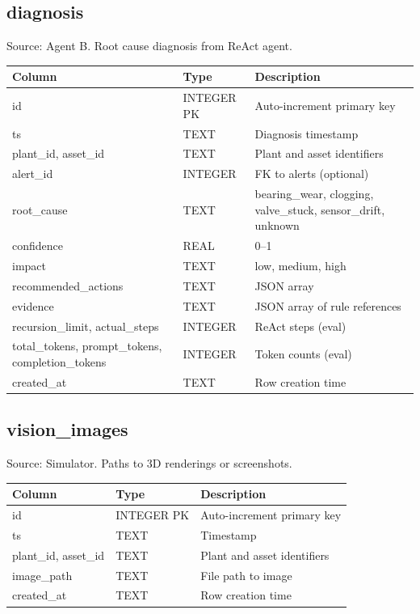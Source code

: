 \documentclass[12pt,letterpaper]{report}
\begin{document}
\subsection*{diagnosis}
Source: Agent B. Root cause diagnosis from ReAct agent.

\begin{tabular}{@{}llp{5.5cm}@{}}
\toprule
\textbf{Column} & \textbf{Type} & \textbf{Description} \\
\midrule
id & INTEGER PK & Auto-increment primary key \\
ts & TEXT & Diagnosis timestamp \\
plant\_id, asset\_id & TEXT & Plant and asset identifiers \\
alert\_id & INTEGER & FK to alerts (optional) \\
root\_cause & TEXT & bearing\_wear, clogging, valve\_stuck, sensor\_drift, unknown \\
confidence & REAL & 0--1 \\
impact & TEXT & low, medium, high \\
recommended\_actions & TEXT & JSON array \\
evidence & TEXT & JSON array of rule references \\
recursion\_limit, actual\_steps & INTEGER & ReAct steps (eval) \\
total\_tokens, prompt\_tokens, completion\_tokens & INTEGER & Token counts (eval) \\
created\_at & TEXT & Row creation time \\
\bottomrule
\end{tabular}

\subsection*{vision\_images}
Source: Simulator. Paths to 3D renderings or screenshots.

\begin{tabular}{@{}llp{5.5cm}@{}}
\toprule
\textbf{Column} & \textbf{Type} & \textbf{Description} \\
\midrule
id & INTEGER PK & Auto-increment primary key \\
ts & TEXT & Timestamp \\
plant\_id, asset\_id & TEXT & Plant and asset identifiers \\
image\_path & TEXT & File path to image \\
created\_at & TEXT & Row creation time \\
\bottomrule
\end{tabular}
\end{document}
